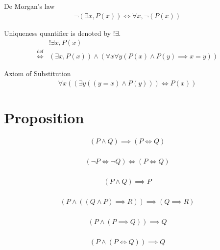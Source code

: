 \begin{axm}
\label{Axiom:De_Morgan_2}
De Morgan's law
\begin{align*}
\lnot (\exists x, P(x)) \iff \forall x, \lnot (P(x))
\end{align*}
\end{axm}

\begin{defn}
\label{Definition:uniqueness_quantifier}
Uniqueness quantifier is denoted by $!\exists$.
\begin{align*}
& !\exists x, P(x) \\
\overset{\operatorname{def}}{\iff} & (\exists x, P(x)) \land (\forall x \forall y (P(x) \land P(y) \implies x = y))
\end{align*}
\end{defn}

\begin{axm}
\label{Axiom:axiom_of_substitution}
Axiom of Substitution
\begin{align*}
\forall x( (\exists y((y = x) \land P(y))) \iff P(x) )
\end{align*}
\end{axm}

\section{Proposition}
\begin{prop}
\label{Proposition:land_implies_iff}
\begin{align*}
(P \land Q) \implies  (P \iff Q) \\
\end{align*}
\end{prop}

\begin{prop}
\label{Proposition:iff_contrapositive}
\begin{align*}
(\lnot P \iff \lnot Q) \iff (P \iff Q) \\
\end{align*}
\end{prop}

\begin{prop}
\label{Proposition:land_omit}
\begin{align*}
(P \land Q) \implies P \\
\end{align*}
\end{prop}

\begin{lemma}
\label{Lemma:uniqueness}
\begin{align*}
(P \land ((Q \land P) \implies R)) \implies (Q \implies R) \\
\end{align*}
\end{lemma}

\begin{prop}
\label{Proposition:implies_satisfy}
\begin{align*}
(P \land (P \implies Q)) \implies Q \\
\end{align*}
\end{prop}

\begin{prop}
\label{Proposition:iff_satisfy}
\begin{align*}
(P \land (P \iff Q)) \implies Q \\
\end{align*}
\end{prop}